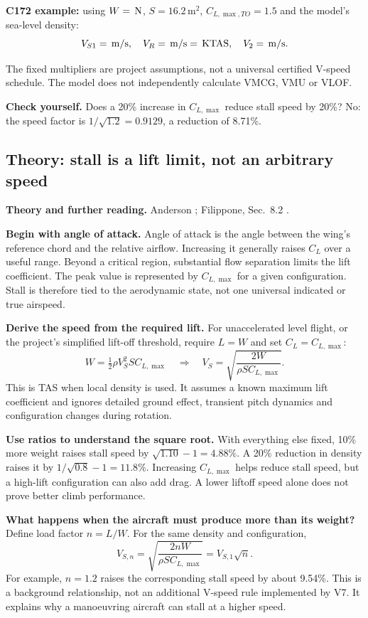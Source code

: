 \documentclass[11pt,letterpaper]{article}
\newcommand{\val}[1]{\csname value#1\endcsname}
\newcommand{\unit}[1]{\,\mathrm{#1}}
\newcommand{\theorypage}[1]{\clearpage\subsection*{\color{navy}\thesection\enspace Theory: #1}}
\newcommand{\reading}[1]{{\small\color{navy}\textbf{Theory and further reading.} #1\par}\vspace{3pt}}
\newcommand{\selfcheck}[1]{\par\textbf{Check yourself.} #1\par}
\begin{document}
\textbf{C172 example:} using $W=\val{weight}\unit N$, $S=16.2\unit{m^2}$,
$C_{L,\max,TO}=1.5$ and the model's sea-level density:
\[
V_{S1}=\val{vs}\unit{m/s},\quad V_R=\val{vr}\unit{m/s}
=\val{vrkt}\unit{KTAS},\quad V_2=\val{vtwo}\unit{m/s}.
\]
\begin{keyidea}
The fixed multipliers are project assumptions, not a universal certified
V-speed schedule. The model does not independently calculate VMCG, VMU or VLOF.
\end{keyidea}
\selfcheck{Does a 20\% increase in $C_{L,\max}$ reduce stall speed by 20\%? No:
the speed factor is $1/\sqrt{1.2}=0.9129$, a reduction of 8.71\%.}


\theorypage{stall is a lift limit, not an arbitrary speed}
\reading{Anderson \cite{anderson-performance,anderson-flight}; Filippone, Sec.~8.2 \cite{filippone}.}
\textbf{Begin with angle of attack.}
Angle of attack is the angle between the wing's reference chord and the relative
airflow. Increasing it generally raises $C_L$ over a useful range. Beyond a
critical region, substantial flow separation limits the lift coefficient.
The peak value is represented by $C_{L,\max}$ for a given configuration.
Stall is therefore tied to the aerodynamic state, not one universal indicated
or true airspeed.

\textbf{Derive the speed from the required lift.}
For unaccelerated level flight, or the project's simplified lift-off threshold,
require $L=W$ and set $C_L=C_{L,\max}$:
\[
W=\tfrac12\rho V_S^2 S C_{L,\max}
\quad\Longrightarrow\quad
V_S=\sqrt{\frac{2W}{\rho S C_{L,\max}}}.
\]
This is TAS when local density is used. It assumes a known maximum lift
coefficient and ignores detailed ground effect, transient pitch dynamics and
configuration changes during rotation.

\textbf{Use ratios to understand the square root.}
With everything else fixed, 10\% more weight raises stall speed by
$\sqrt{1.10}-1=4.88\%$. A 20\% reduction in density raises it by
$1/\sqrt{0.8}-1=11.8\%$. Increasing $C_{L,\max}$ helps reduce stall speed,
but a high-lift configuration can also add drag. A lower liftoff speed alone
does not prove better climb performance.

\textbf{What happens when the aircraft must produce more than its weight?}
Define load factor $n=L/W$. For the same density and configuration,
\[
V_{S,n}=\sqrt{\frac{2nW}{\rho S C_{L,\max}}}=V_{S,1}\sqrt n.
\]
For example, $n=1.2$ raises the corresponding stall speed by about 9.54\%.
This is a background relationship, not an additional V-speed rule implemented
by V7. It explains why a manoeuvring aircraft can stall at a higher speed.
\end{document}
